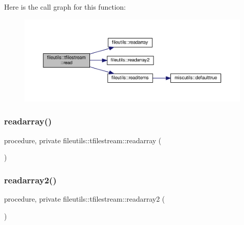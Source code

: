 Here is the call graph for this function\+:
\nopagebreak
\begin{figure}[H]
\begin{center}
\leavevmode
\includegraphics[width=350pt]{structfileutils_1_1tfilestream_a3eba218f4da08feade1f6fe889f82332_cgraph}
\end{center}
\end{figure}
\mbox{\label{structfileutils_1_1tfilestream_a4cc4e5507c5109e1fd1072db3c47280d}} 
\subsubsection{\texorpdfstring{readarray()}{readarray()}}
{\footnotesize\ttfamily procedure, private fileutils\+::tfilestream\+::readarray (\begin{DoxyParamCaption}{ }\end{DoxyParamCaption})\hspace{0.3cm}{\ttfamily [private]}}

\mbox{\label{structfileutils_1_1tfilestream_a74d34861927de554b6d5789dd4ebc813}} 
\subsubsection{\texorpdfstring{readarray2()}{readarray2()}}
{\footnotesize\ttfamily procedure, private fileutils\+::tfilestream\+::readarray2 (\begin{DoxyParamCaption}{ }\end{DoxyParamCaption})\hspace{0.3cm}{\ttfamily [private]}}

